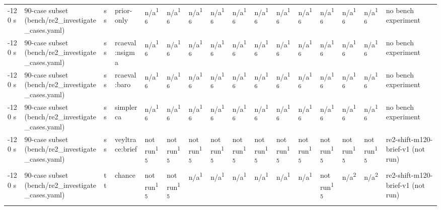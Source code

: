 \begin{table}[t]
\begin{tabular}{llllllllllllllll}
-120 s & 90-case subset (bench/re2\_investigate\_cases.yaml) & ss & prior-only & n/a\textsuperscript{16} & n/a\textsuperscript{16} & n/a\textsuperscript{16} & n/a\textsuperscript{16} & n/a\textsuperscript{16} & n/a\textsuperscript{16} & n/a\textsuperscript{16} & n/a\textsuperscript{16} & n/a\textsuperscript{16} & n/a\textsuperscript{16} & n/a\textsuperscript{16} & no bench experiment \\
-120 s & 90-case subset (bench/re2\_investigate\_cases.yaml) & ss & rcaeval:nsigma & n/a\textsuperscript{16} & n/a\textsuperscript{16} & n/a\textsuperscript{16} & n/a\textsuperscript{16} & n/a\textsuperscript{16} & n/a\textsuperscript{16} & n/a\textsuperscript{16} & n/a\textsuperscript{16} & n/a\textsuperscript{16} & n/a\textsuperscript{16} & n/a\textsuperscript{16} & no bench experiment \\
-120 s & 90-case subset (bench/re2\_investigate\_cases.yaml) & ss & rcaeval:baro & n/a\textsuperscript{16} & n/a\textsuperscript{16} & n/a\textsuperscript{16} & n/a\textsuperscript{16} & n/a\textsuperscript{16} & n/a\textsuperscript{16} & n/a\textsuperscript{16} & n/a\textsuperscript{16} & n/a\textsuperscript{16} & n/a\textsuperscript{16} & n/a\textsuperscript{16} & no bench experiment \\
-120 s & 90-case subset (bench/re2\_investigate\_cases.yaml) & ss & simplerca & n/a\textsuperscript{16} & n/a\textsuperscript{16} & n/a\textsuperscript{16} & n/a\textsuperscript{16} & n/a\textsuperscript{16} & n/a\textsuperscript{16} & n/a\textsuperscript{16} & n/a\textsuperscript{16} & n/a\textsuperscript{16} & n/a\textsuperscript{16} & n/a\textsuperscript{16} & no bench experiment \\
-120 s & 90-case subset (bench/re2\_investigate\_cases.yaml) & ss & veyltrace:brief & not run\textsuperscript{15} & not run\textsuperscript{15} & not run\textsuperscript{15} & not run\textsuperscript{15} & not run\textsuperscript{15} & not run\textsuperscript{15} & not run\textsuperscript{15} & not run\textsuperscript{15} & not run\textsuperscript{15} & not run\textsuperscript{15} & not run\textsuperscript{15} & re2-shift-m120-brief-v1 (not run) \\
-120 s & 90-case subset (bench/re2\_investigate\_cases.yaml) & tt & chance & not run\textsuperscript{15} & not run\textsuperscript{15} & n/a\textsuperscript{1} & n/a\textsuperscript{1} & n/a\textsuperscript{1} & n/a\textsuperscript{1} & n/a\textsuperscript{1} & n/a\textsuperscript{1} & not run\textsuperscript{15} & n/a\textsuperscript{2} & n/a\textsuperscript{2} & re2-shift-m120-brief-v1 (not run) \\

\end{tabular}
\end{table}
